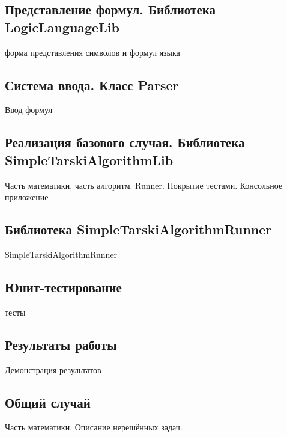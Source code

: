 \subsection{Представление формул. Библиотека LogicLanguageLib}
форма представления символов и формул языка

\subsection{Система ввода. Класс Parser}
Ввод формул

\subsection{Реализация базового случая. Библиотека SimpleTarskiAlgorithmLib}
Часть математики, часть алгоритм. Runner. Покрытие тестами. Консольное приложение

\subsection{Библиотека SimpleTarskiAlgorithmRunner}
SimpleTarskiAlgorithmRunner

\subsection{Юнит-тестирование}
тесты

\subsection{Результаты работы}
Демонстрация результатов

\subsection{Общий случай}
Часть математики. Описание нерешённых задач.


